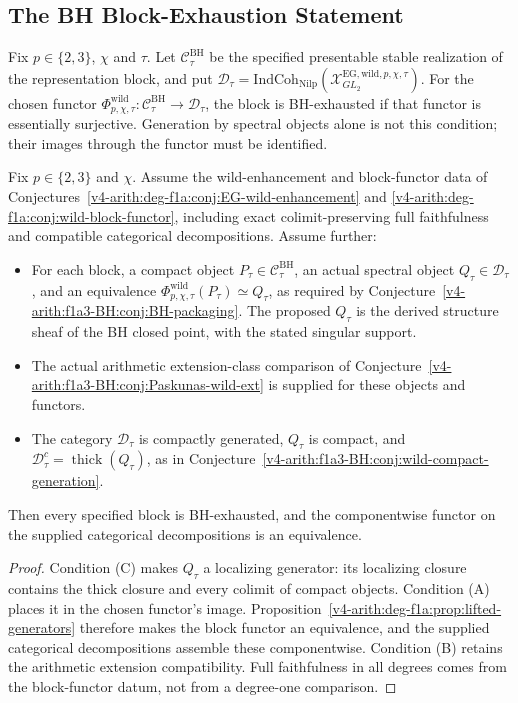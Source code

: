 \subsection{The BH Block-Exhaustion Statement}

\begin{definition}
\label{v4-arith:f1a3-BH:def:BH-exhausted}
Fix \(p\in\{2,3\}\), \(\chi\) and \(\tau\). Let
\(\mathcal C_\tau^{\mathrm{BH}}\) be the specified presentable stable
realization of the representation block, and put
\(\mathcal D_\tau=\mathrm{IndCoh}_{\mathrm{Nilp}}
(\mathcal X^{\mathrm{EG,wild},p,\chi,\tau}_{GL_2})\).
For the chosen functor
\(\Phi^{\mathrm{wild}}_{p,\chi,\tau}:\mathcal C_\tau^{\mathrm{BH}}
\to\mathcal D_\tau\), the block is BH-exhausted if that functor
is essentially surjective. Generation by spectral objects alone is
not this condition; their images through the functor must be identified.
\end{definition}

\begin{theorem}
\label{v4-arith:f1a3-BH:thm:main}
Fix \(p\in\{2,3\}\) and \(\chi\). Assume the wild-enhancement
and block-functor data of
Conjectures~\ref{v4-arith:deg-f1a:conj:EG-wild-enhancement} and
\ref{v4-arith:deg-f1a:conj:wild-block-functor}, including exact
colimit-preserving full faithfulness and compatible categorical
decompositions. Assume further:
\begin{itemize}
\item[(A)] For each block, a compact object
\(P_\tau\in\mathcal C_\tau^{\mathrm{BH}}\), an actual spectral
object \(Q_\tau\in\mathcal D_\tau\), and an equivalence
\(\Phi^{\mathrm{wild}}_{p,\chi,\tau}(P_\tau)\simeq Q_\tau\),
as required by Conjecture~\ref{v4-arith:f1a3-BH:conj:BH-packaging}.
The proposed \(Q_\tau\) is the derived structure sheaf of the BH
closed point, with the stated singular support.
\item[(B)] The actual arithmetic extension-class comparison of
Conjecture~\ref{v4-arith:f1a3-BH:conj:Paskunas-wild-ext} is supplied
for these objects and functors.
\item[(C)] The category \(\mathcal D_\tau\) is compactly generated,
\(Q_\tau\) is compact, and
\(\mathcal D_\tau^c=\operatorname{thick}(Q_\tau)\), as in
Conjecture~\ref{v4-arith:f1a3-BH:conj:wild-compact-generation}.
\end{itemize}
Then every specified block is BH-exhausted, and the componentwise
functor on the supplied categorical decompositions is an equivalence.
\end{theorem}
\begin{proof}
Condition (C) makes \(Q_\tau\) a localizing generator: its
localizing closure contains the thick closure and every colimit of
compact objects. Condition (A) places it in the chosen functor's
image. Proposition~\ref{v4-arith:deg-f1a:prop:lifted-generators}
therefore makes the block functor an equivalence, and the supplied
categorical decompositions assemble these componentwise.
Condition (B) retains the arithmetic extension compatibility.
Full faithfulness in all degrees comes from the block-functor datum,
not from a degree-one comparison.
\end{proof}

